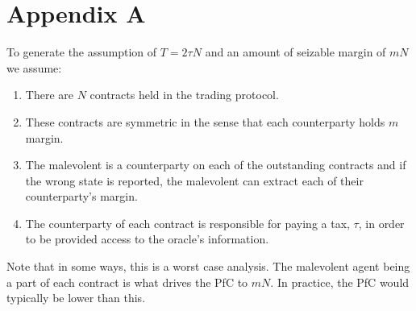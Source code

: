 \documentclass[12pt]{article}
\begin{document}
\section{Appendix A}

  To generate the assumption of $T = 2 \tau N$ and an amount of seizable margin of $mN$ we assume:

  \begin{enumerate}
    \item There are $N$ contracts held in the trading protocol.
    \item These contracts are symmetric in the sense that each counterparty holds $m$ margin.
    \item The malevolent is a counterparty on each of the outstanding contracts and if the wrong
    state is reported, the malevolent can extract each of their counterparty's margin.
    \item The counterparty of each contract is responsible for paying a tax, $\tau$, in order to
    be provided access to the oracle's information.
  \end{enumerate}

  Note that in some ways, this is a worst case analysis. The malevolent agent being a part of each
  contract is what drives the PfC to $mN$. In practice, the PfC would typically be lower than this.
\end{document}
